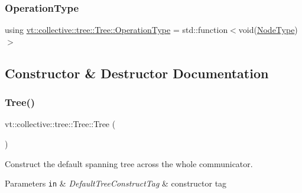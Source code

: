 \subsubsection{\texorpdfstring{Operation\+Type}{OperationType}}
{\footnotesize\ttfamily using \hyperlink{structvt_1_1collective_1_1tree_1_1_tree_a5ce4242e9580c807baa74168401f381a}{vt\+::collective\+::tree\+::\+Tree\+::\+Operation\+Type} =  std\+::function$<$void(\hyperlink{namespacevt_a866da9d0efc19c0a1ce79e9e492f47e2}{Node\+Type})$>$}



\subsection{Constructor \& Destructor Documentation}
\mbox{\label{structvt_1_1collective_1_1tree_1_1_tree_ae9570e9a8f303295744e99b527603a51}} 
\subsubsection{\texorpdfstring{Tree()}{Tree()}\hspace{0.1cm}{\footnotesize\ttfamily [1/3]}}
{\footnotesize\ttfamily vt\+::collective\+::tree\+::\+Tree\+::\+Tree (\begin{DoxyParamCaption}\item[{Default\+Tree\+Construct\+Tag}]{ }\end{DoxyParamCaption})\hspace{0.3cm}{\ttfamily [explicit]}}



Construct the default spanning tree across the whole communicator. 


\begin{DoxyParams}[1]{Parameters}
\mbox{\tt in}  & {\em Default\+Tree\+Construct\+Tag} & constructor tag \\
\hline
\end{DoxyParams}
\mbox{\label{structvt_1_1collective_1_1tree_1_1_tree_ad759f716890ce5344a6c6053fcdc7055}} 
